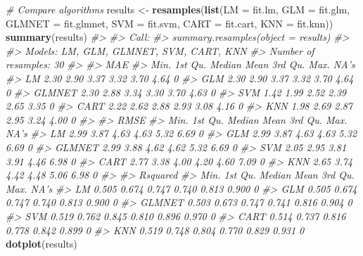 \documentclass[]{book}
\newenvironment{Shaded}{\begin{snugshade}}{\end{snugshade}}
\newcommand{\CommentTok}[1]{\textcolor[rgb]{0.56,0.35,0.01}{\textit{#1}}}
\newcommand{\DataTypeTok}[1]{\textcolor[rgb]{0.13,0.29,0.53}{#1}}
\newcommand{\KeywordTok}[1]{\textcolor[rgb]{0.13,0.29,0.53}{\textbf{#1}}}
\newcommand{\NormalTok}[1]{#1}
\newcommand{\StringTok}[1]{\textcolor[rgb]{0.31,0.60,0.02}{#1}}
\begin{document}
\begin{Shaded}
\begin{Highlighting}[]
\CommentTok{# Compare algorithms}
\NormalTok{results <-}\StringTok{ }\KeywordTok{resamples}\NormalTok{(}\KeywordTok{list}\NormalTok{(}\DataTypeTok{LM     =}\NormalTok{ fit.lm, }
                          \DataTypeTok{GLM    =}\NormalTok{ fit.glm, }
                          \DataTypeTok{GLMNET =}\NormalTok{ fit.glmnet, }
                          \DataTypeTok{SVM    =}\NormalTok{ fit.svm, }
                          \DataTypeTok{CART   =}\NormalTok{ fit.cart, }
                          \DataTypeTok{KNN    =}\NormalTok{ fit.knn))}
\KeywordTok{summary}\NormalTok{(results)}
\CommentTok{#> }
\CommentTok{#> Call:}
\CommentTok{#> summary.resamples(object = results)}
\CommentTok{#> }
\CommentTok{#> Models: LM, GLM, GLMNET, SVM, CART, KNN }
\CommentTok{#> Number of resamples: 30 }
\CommentTok{#> }
\CommentTok{#> MAE }
\CommentTok{#>        Min. 1st Qu. Median Mean 3rd Qu. Max. NA's}
\CommentTok{#> LM     2.30    2.90   3.37 3.32    3.70 4.64    0}
\CommentTok{#> GLM    2.30    2.90   3.37 3.32    3.70 4.64    0}
\CommentTok{#> GLMNET 2.30    2.88   3.34 3.30    3.70 4.63    0}
\CommentTok{#> SVM    1.42    1.99   2.52 2.39    2.65 3.35    0}
\CommentTok{#> CART   2.22    2.62   2.88 2.93    3.08 4.16    0}
\CommentTok{#> KNN    1.98    2.69   2.87 2.95    3.24 4.00    0}
\CommentTok{#> }
\CommentTok{#> RMSE }
\CommentTok{#>        Min. 1st Qu. Median Mean 3rd Qu. Max. NA's}
\CommentTok{#> LM     2.99    3.87   4.63 4.63    5.32 6.69    0}
\CommentTok{#> GLM    2.99    3.87   4.63 4.63    5.32 6.69    0}
\CommentTok{#> GLMNET 2.99    3.88   4.62 4.62    5.32 6.69    0}
\CommentTok{#> SVM    2.05    2.95   3.81 3.91    4.46 6.98    0}
\CommentTok{#> CART   2.77    3.38   4.00 4.20    4.60 7.09    0}
\CommentTok{#> KNN    2.65    3.74   4.42 4.48    5.06 6.98    0}
\CommentTok{#> }
\CommentTok{#> Rsquared }
\CommentTok{#>         Min. 1st Qu. Median  Mean 3rd Qu.  Max. NA's}
\CommentTok{#> LM     0.505   0.674  0.747 0.740   0.813 0.900    0}
\CommentTok{#> GLM    0.505   0.674  0.747 0.740   0.813 0.900    0}
\CommentTok{#> GLMNET 0.503   0.673  0.747 0.741   0.816 0.904    0}
\CommentTok{#> SVM    0.519   0.762  0.845 0.810   0.896 0.970    0}
\CommentTok{#> CART   0.514   0.737  0.816 0.778   0.842 0.899    0}
\CommentTok{#> KNN    0.519   0.748  0.804 0.770   0.829 0.931    0}
\KeywordTok{dotplot}\NormalTok{(results)}
\end{Highlighting}
\end{Shaded}
\end{document}
